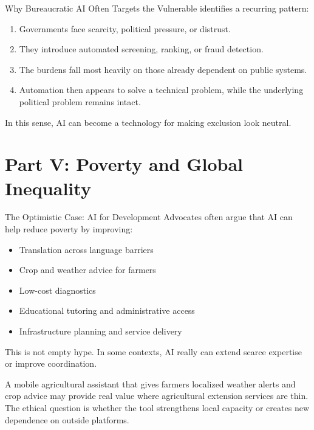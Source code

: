 \documentclass[aspectratio=169,11pt]{beamer}
\begin{document}
\begin{frame}{Why Bureaucratic AI Often Targets the Vulnerable}
\textcite{eubanks_automating_inequality} identifies a recurring pattern:

\vspace{0.2cm}
\begin{enumerate}
    \item Governments face scarcity, political pressure, or distrust.
    \item They introduce automated screening, ranking, or fraud detection.
    \item The burdens fall most heavily on those already dependent on public systems.
    \item Automation then appears to solve a technical problem, while the underlying political problem remains intact.
\end{enumerate}

\vspace{0.2cm}
In this sense, AI can become a technology for making exclusion look neutral.
\end{frame}

\section{Part V: Poverty and Global Inequality}

\begin{frame}{The Optimistic Case: AI for Development}
Advocates often argue that AI can help reduce poverty by improving:
\begin{itemize}
    \item Translation across language barriers
    \item Crop and weather advice for farmers
    \item Low-cost diagnostics
    \item Educational tutoring and administrative access
    \item Infrastructure planning and service delivery
\end{itemize}

\vspace{0.2cm}
This is not empty hype. In some contexts, AI really can extend scarce expertise or improve coordination.

\vspace{0.2cm}
\begin{casestudybox}[Example]
\scriptsize
A mobile agricultural assistant that gives farmers localized weather alerts and crop advice may provide real value where agricultural extension services are thin. The ethical question is whether the tool strengthens local capacity or creates new dependence on outside platforms.
\end{casestudybox}
\end{frame}
\end{document}
